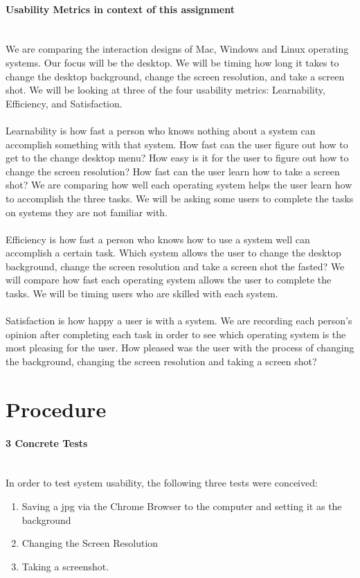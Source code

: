 \documentclass[12pt, onesided, letterpaper]{report}
\begin{document}
\paragraph*{Usability Metrics in context of this assignment}~\\
We are comparing the interaction designs of Mac, Windows and Linux operating systems.  Our focus will be the desktop.  We will be timing how long it takes to change the desktop background, change the screen resolution, and take a screen shot.  We will be looking at three of the four usability metrics: Learnability, Efficiency, and Satisfaction.  \\
~\\
Learnability is how fast a person who knows nothing about a system can accomplish something with that system.  How fast can the user figure out how to get to the change desktop menu?  How easy is it for the user to figure out how to change the screen resolution?  How fast can the user learn how to take a screen shot?  We are comparing how well each operating system helps the user learn how to accomplish the three tasks.  We will be asking some users to complete the tasks on systems they are not familiar with.\\

~\\
Efficiency is how fast a person who knows how to use a system well can accomplish a certain task.  Which system allows the user to change the desktop background, change the screen resolution and take a screen shot the fasted?  We will compare how fast each operating system allows the user to complete the tasks.  We will be timing users who are skilled with each system.\\
~\\
Satisfaction is how happy a user is with a system.  We are recording each person's opinion after completing each task in order to see which operating system is the most pleasing for the user.  How pleased was the user with the process of changing the background, changing the screen resolution and taking a screen shot?\\

\pagebreak

\section*{Procedure}

\paragraph*{3 Concrete Tests} ~\\
In order to test system usability, the following three tests were conceived:
\begin{enumerate}
\item Saving a jpg via the Chrome Browser to the computer and setting it as the background
\item Changing the Screen Resolution
\item Taking a screenshot.
\end{enumerate}
\end{document}
